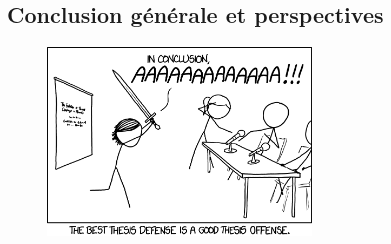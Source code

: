 

{}

\vspace*{-1cm}
\begin{flushright}
\section*{\fontsize{20pt}{20pt}\selectfont\textnormal{Conclusion générale et perspectives}}
\end{flushright}
\vspace{2cm}

\chead[\fancyplain{}{}]
      {\fancyplain{}{}}
\lfoot[\fancyplain{}{\thepage}]
      {\fancyplain{}{}}
\cfoot[\fancyplain{}{}]
      {\fancyplain{}{}}
\rfoot[\fancyplain{}{}]
     {\fancyplain{}{\thepage}}


\begin{figure}[h!]
\centering
\includegraphics[width=7cm,clip]{../Conclusion/Images/thesis_defense_2x.png}
\end{figure}